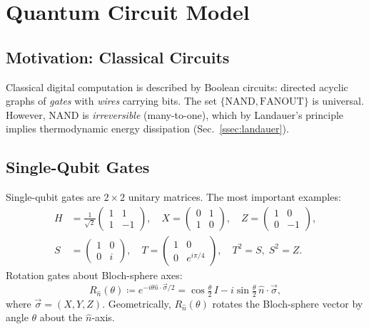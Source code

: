 \documentclass[aps, reprint, twocolumn, superscriptaddress, floatfix]{revtex4-2}
\begin{document}
\section{Quantum Circuit Model}
\label{sec:circuits}

\subsection{Motivation: Classical Circuits}
\label{ssec:classical-circuits}

Classical digital computation is described by Boolean circuits: directed acyclic
graphs of \emph{gates} with \emph{wires} carrying bits.  The set
$\{\mathrm{NAND}, \mathrm{FANOUT}\}$ is universal.  However, $\mathrm{NAND}$ is
\emph{irreversible} (many-to-one), which by Landauer's principle implies
thermodynamic energy dissipation (Sec.~\ref{ssec:landauer}).

\subsection{Single-Qubit Gates}
\label{ssec:single-qubit}

Single-qubit gates are $2\times 2$ unitary matrices.  The most important examples:
\begin{align}
  H &= \tfrac{1}{\sqrt{2}}\begin{pmatrix}1&1\\1&-1\end{pmatrix}, \quad
  X = \begin{pmatrix}0&1\\1&0\end{pmatrix}, \quad
  Z = \begin{pmatrix}1&0\\0&-1\end{pmatrix}, \\
  S &= \begin{pmatrix}1&0\\0&i\end{pmatrix}, \quad
  T  = \begin{pmatrix}1&0\\0&e^{i\pi/4}\end{pmatrix}, \quad T^2=S,\;S^2=Z.
\end{align}
Rotation gates about Bloch-sphere axes:
\begin{equation}
  R_{\hat{n}}(\theta) \coloneqq e^{-i\theta\hat{n}\cdot\vec{\sigma}/2}
    = \cos\!\tfrac{\theta}{2}\,I - i\sin\!\tfrac{\theta}{2}\,\hat{n}\cdot\vec{\sigma},
  \label{eq:rotation}
\end{equation}
where $\vec{\sigma} = (X,Y,Z)$.  Geometrically, $R_{\hat{n}}(\theta)$ rotates the
Bloch-sphere vector by angle $\theta$ about the $\hat{n}$-axis.
\end{document}
